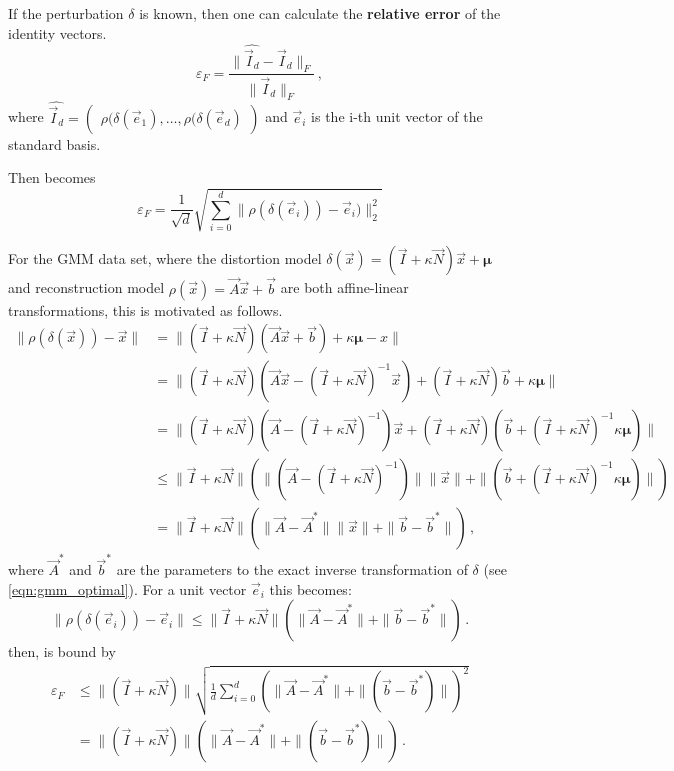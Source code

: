 If the perturbation $\delta$ is known, then one can calculate the \textbf{relative error} of the identity vectors. 
\begin{equation}
\label{eqn:fro_error}
    \varepsilon_F = \frac {\|\widehat {\vec I_d} - \vec I_d\|_F} {\|\vec I_d\|_F} \,,
\end{equation}
where $\widehat {\vec I_d} = \begin{pmatrix} \rho (\delta (\vec e_1), \dots, \rho (\delta (\vec e_d) \end{pmatrix}$ and $\vec e_i$ is the i-th unit vector of the standard basis.

Then  becomes
\begin{equation}
\label{eqn:l2_error}
    \varepsilon_F = \frac 1 {\sqrt d} \sqrt{ \sum_{i=0}^d \|\rho (\delta (\vec e_i)) - \vec e_i)\|_2^2}
\end{equation}

For the GMM data set, where the distortion model $\delta(\vec x) = (\vec I + \kappa \vec N) \vec x + \boldsymbol \mu$
and reconstruction model $\rho(\vec x) = \vec A \vec x + \vec b$ are both affine-linear transformations,
this is motivated as follows.
\begin{align*}
    \|\rho(\delta (\vec x)) - \vec x \| 
    &= \|(\vec I + \kappa \vec N) (\vec A \vec x + \vec b) + \kappa \boldsymbol \mu  - x \| \\
    &= \|(\vec I + \kappa \vec N) (\vec A \vec x - (\vec I + \kappa \vec N)^{-1} \vec x) 
        + (\vec I + \kappa \vec N) \vec b + \kappa \boldsymbol \mu  \| \\
    &= \|(\vec I + \kappa \vec N) (\vec A - (\vec I + \kappa \vec N)^{-1}) \vec x 
        + (\vec I + \kappa \vec N) (\vec b + (\vec I + \kappa \vec N)^{-1} \kappa \boldsymbol \mu)  \| \\
    &\leq \|\vec I + \kappa \vec N\| \left(\|(\vec A - (\vec I + \kappa \vec N)^{-1})\| \|\vec x\| 
        + \|(\vec b + (\vec I + \kappa \vec N)^{-1} \kappa \boldsymbol \mu)  \| \right)\\
    &= \|\vec I + \kappa \vec N\| \left(\|\vec A - \vec A^* \| \|\vec x\| 
        + \|\vec b - \vec b ^*\| \right) \,,
\end{align*}
where $\vec A ^*$ and $\vec b^*$ are the parameters to the exact inverse transformation of $\delta$ 
(see \ref{eqn:gmm_optimal}).
For a unit vector $\vec e_i$ this becomes:
\begin{equation*}
    \|\rho(\delta (\vec e_i)) - \vec e_i \| 
    \leq \|\vec I + \kappa \vec N\| \left(\|\vec A - \vec A^* \| 
        + \|\vec b - \vec b ^*\| \right) \,.
\end{equation*}
 then, is bound by
\begin{align*}
    \varepsilon_F 
    &\leq \|(\vec I + \kappa \vec N)\|
    \sqrt{ \frac 1 d \sum_{i=0}^d \left(\|\vec A - \vec A^* \|  + \|(\vec b - \vec b ^*)  \| \right)^2} \\
    &= \|(\vec I + \kappa \vec N)\| \left(\|\vec A - \vec A^* \|  + \|(\vec b - \vec b ^*)  \| \right) \,.
\end{align*}

